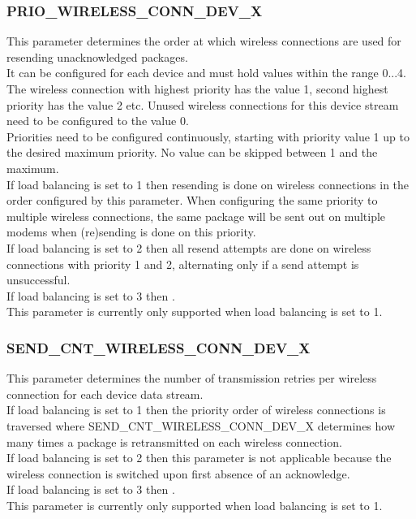 \subsubsection{PRIO\_WIRELESS\_CONN\_DEV\_X}
This parameter determines the order at which wireless connections are used for resending unacknowledged packages.\\
It can be configured for each device and must hold values within the range 0...4. The wireless connection with highest priority has the value 1, second highest priority has the value 2 etc. Unused wireless connections for this device stream need to be configured to the value 0.\\
Priorities need to be configured continuously, starting with priority value 1 up to the desired maximum priority. No value can be skipped between 1 and the maximum.\\
If load balancing is set to 1 then resending is done on wireless connections in the order configured by this parameter. When configuring the same priority to multiple wireless connections, the same package will be sent out on multiple modems when (re)sending is done on this priority.\\
If load balancing is set to 2 then all resend attempts are done on wireless connections with priority 1 and 2, alternating only if a send attempt is unsuccessful.\\
If load balancing is set to 3 then .\\
This parameter is currently only supported when load balancing is set to 1.
%
\subsubsection{SEND\_CNT\_WIRELESS\_CONN\_DEV\_X}
This parameter determines the number of transmission retries per wireless connection for each device data stream.\\
If load balancing is set to 1 then the priority order of wireless connections is traversed where SEND\_CNT\_WIRELESS\_CONN\_DEV\_X determines how many times a package is retransmitted on each wireless connection.\\
If load balancing is set to 2 then this parameter is not applicable because the wireless connection is switched upon first absence of an acknowledge.\\
If load balancing is set to 3 then .\\
This parameter is currently only supported when load balancing is set to 1.
%
